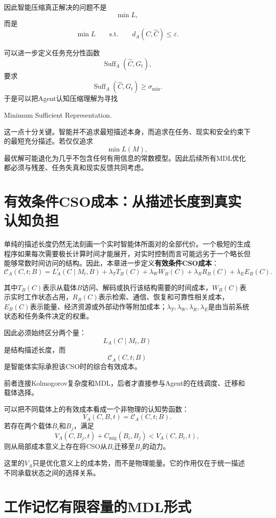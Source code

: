 因此智能压缩真正解决的问题不是
\[
\min L,
\]
而是
\[
\boxed{
\min L
\qquad
\text{s.t.}
\qquad
d_A(C,\hat C)\leq\varepsilon.
}
\]

可以进一步定义任务充分性函数
\[
\operatorname{Suff}_A(\hat C,G_t),
\]
要求
\[
\operatorname{Suff}_A(\hat C,G_t)
\geq
\sigma_{\min}.
\]
于是可以把Agent认知压缩理解为寻找
\begin{statementbox}
Minimum Sufficient Representation.
\end{statementbox}

这一点十分关键。智能并不追求最短描述本身，而追求在任务、现实和安全约束下的最短充分描述。若仅仅追求
\[
\min L(M),
\]
最优解可能退化为几乎不包含任何有用信息的常数模型。因此后续所有MDL优化都必须与残差、任务失真和现实反馈共同考虑。

\section{有效条件CSO成本：从描述长度到真实认知负担}

单纯的描述长度仍然无法刻画一个实时智能体所面对的全部代价。一个极短的生成程序如果每次需要极长计算时间才能展开，对实时控制而言可能远劣于一个略长但能够常数时间访问的结构。因此，本章进一步定义\textbf{有效条件CSO成本}：
\[
\boxed{
\mathscr{C}_A(C,t;B)
=
L_A^\varepsilon(C\mid M_t,B)
+
\lambda_T T_B(C)
+
\lambda_W W_B(C)
+
\lambda_R R_B(C)
+
\lambda_E E_B(C).
}
\]

其中$T_B(C)$表示从载体$B$访问、解码或执行该结构需要的时间成本，$W_B(C)$表示实时工作状态占用，$R_B(C)$表示检索、通信、恢复和可靠性相关成本，$E_B(C)$表示能量、经济资源或外部动作等附加成本；$\lambda_T,\lambda_W,\lambda_R,\lambda_E$是由当前系统状态和任务条件决定的权重。

因此必须始终区分两个量：
\[
\boxed{
L_A(C\mid M_t,B)
}
\]
是结构描述长度，而
\[
\boxed{
\mathscr{C}_A(C,t;B)
}
\]
是智能体实际承担该CSO时的综合有效成本。

前者连接Kolmogorov复杂度和MDL，后者才直接参与Agent的在线调度、迁移和载体选择。

可以把不同载体上的有效成本看成一个非物理的认知势函数：
\[
V_A(C,B,t)
=
\mathscr{C}_A(C,t;B).
\]
若存在两个载体$B_i$和$B_j$，满足
\[
V_A(C,B_j,t)
+
C_{\mathrm{mig}}(B_i,B_j)
<
V_A(C,B_i,t),
\]
则从局部成本意义上存在将CSO从$B_i$迁移至$B_j$的动力。

这里的$V_A$只是优化意义上的成本势，而不是物理能量。它的作用仅在于统一描述不同承载状态之间的选择关系。

\section{工作记忆有限容量的MDL形式}

